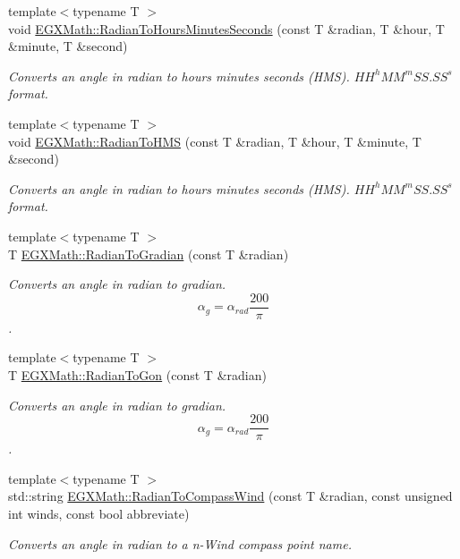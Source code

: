 \begin{DoxyCompactItemize}
{\footnotesize template$<$typename T $>$ }\\void \mbox{\hyperlink{group___e_g_x_math-_angle_conversions-_radian_ga3467598d89af2b8ff68af50b39bb19e2}{E\+G\+X\+Math\+::\+Radian\+To\+Hours\+Minutes\+Seconds}} (const T \&radian, T \&hour, T \&minute, T \&second)
\begin{DoxyCompactList}\small\item\em Converts an angle in radian to hours minutes seconds (H\+MS). ${HH}^h{MM}^m{SS.SS}^s$ format. \end{DoxyCompactList}\item 
{\footnotesize template$<$typename T $>$ }\\void \mbox{\hyperlink{group___e_g_x_math-_angle_conversions-_radian_ga55b5fba9307f34ab8db57391789a90cc}{E\+G\+X\+Math\+::\+Radian\+To\+H\+MS}} (const T \&radian, T \&hour, T \&minute, T \&second)
\begin{DoxyCompactList}\small\item\em Converts an angle in radian to hours minutes seconds (H\+MS). ${HH}^h{MM}^m{SS.SS}^s$ format. \end{DoxyCompactList}\item 
{\footnotesize template$<$typename T $>$ }\\T \mbox{\hyperlink{group___e_g_x_math-_angle_conversions-_radian_ga3c1607eae50cbf0186c42485bb3878d5}{E\+G\+X\+Math\+::\+Radian\+To\+Gradian}} (const T \&radian)
\begin{DoxyCompactList}\small\item\em Converts an angle in radian to gradian. \[\alpha_{g}=\alpha_{rad}\frac{200}{\pi}\]. \end{DoxyCompactList}\item 
{\footnotesize template$<$typename T $>$ }\\T \mbox{\hyperlink{group___e_g_x_math-_angle_conversions-_radian_ga36912e5a810b64c271c4dafc17f4ca45}{E\+G\+X\+Math\+::\+Radian\+To\+Gon}} (const T \&radian)
\begin{DoxyCompactList}\small\item\em Converts an angle in radian to gradian. \[\alpha_{g}=\alpha_{rad}\frac{200}{\pi}\]. \end{DoxyCompactList}\item 
{\footnotesize template$<$typename T $>$ }\\std\+::string \mbox{\hyperlink{group___e_g_x_math-_angle_conversions-_radian_ga4d845b171148481aa7e85018d6dad035}{E\+G\+X\+Math\+::\+Radian\+To\+Compass\+Wind}} (const T \&radian, const unsigned int winds, const bool abbreviate)
\begin{DoxyCompactList}\small\item\em Converts an angle in radian to a n-\/\+Wind compass point name. \end{DoxyCompactList}\end{DoxyCompactItemize}


